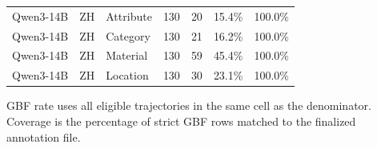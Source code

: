 \begin{table}[t]
\begin{tabular}{lllrrrr}
        Qwen3-14B & ZH & Attribute & 130 & 20 & 15.4\% & 100.0\% \\
        Qwen3-14B & ZH & Category & 130 & 21 & 16.2\% & 100.0\% \\
        Qwen3-14B & ZH & Material & 130 & 59 & 45.4\% & 100.0\% \\
        Qwen3-14B & ZH & Location & 130 & 30 & 23.1\% & 100.0\% \\
        \bottomrule
    \end{tabular}
    \vspace{0.5em}
    \parbox{0.98\textwidth}{\footnotesize GBF rate uses all eligible trajectories in the same cell as the denominator. Coverage is the percentage of strict GBF rows matched to the finalized annotation file.}
\end{table}
